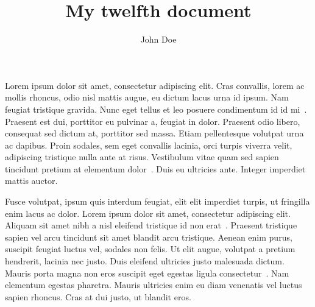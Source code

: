 \documentclass{article}
\title{My twelfth document}
\author{John Doe}
\begin{document}
   \maketitle
   
   Lorem ipsum dolor sit amet, consectetur adipiscing elit. Cras convallis, lorem ac mollis rhoncus, odio nisl mattis augue, eu dictum lacus urna id ipsum. Nam feugiat tristique gravida. Nunc eget tellus et leo posuere condimentum id id mi~\cite{rowling2007}. Praesent est dui, porttitor eu pulvinar a, feugiat in dolor. Praesent odio libero, consequat sed dictum at, porttitor sed massa. Etiam pellentesque volutpat urna ac dapibus. Proin sodales, sem eget convallis lacinia, orci turpis viverra velit, adipiscing tristique nulla ante at risus. Vestibulum vitae quam sed sapien tincidunt pretium at elementum dolor~\cite{altschul1997}. Duis eu ultricies ante. Integer imperdiet mattis auctor.

Fusce volutpat, ipsum quis interdum feugiat, elit elit imperdiet turpis, ut fringilla enim lacus ac dolor. Lorem ipsum dolor sit amet, consectetur adipiscing elit. Aliquam sit amet nibh a nisl eleifend tristique id non erat~\cite{quinlan1986}. Praesent tristique sapien vel arcu tincidunt sit amet blandit arcu tristique. Aenean enim purus, suscipit feugiat luctus vel, sodales non felis. Ut elit augue, volutpat a pretium hendrerit, lacinia nec justo. Duis eleifend ultricies justo malesuada dictum. Mauris porta magna non eros suscipit eget egestas ligula consectetur~\cite{quinlan1986}. Nam elementum egestas pharetra. Mauris ultricies enim eu diam venenatis vel luctus sapien rhoncus. Cras at dui justo, ut blandit eros. 
   
   \nocite{*} %
   
   
   
\end{document}
